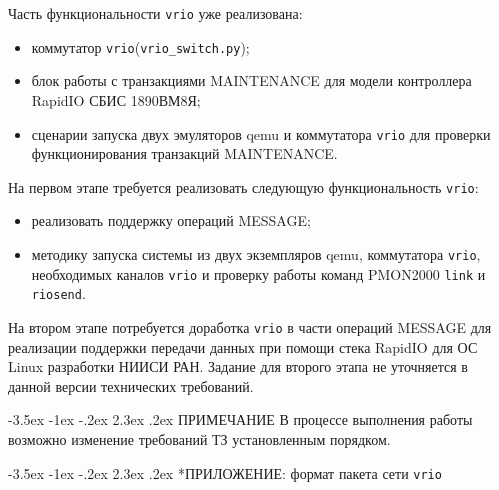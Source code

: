 \documentclass[14pt,a4paper,oneside]{report}
\makeatletter
\renewcommand\section{\@startsection {section}{1}{\z@}%
                                   {-3.5ex \@plus -1ex \@minus -.2ex}%
                                   {2.3ex \@plus.2ex}%
                                   {\normalfont\normalsize}}
\newcommand{\vrio}{\texttt{vrio}\xspace}
\makeatother
\begin{document}
Часть функциональности \vrio уже реализована:
\begin{itemize}
\item коммутатор \vrio (\verb#vrio_switch.py#);
\item блок работы с транзакциями MAINTENANCE для модели
контроллера RapidIO СБИС 1890ВМ8Я;
\item сценарии запуска двух эмуляторов qemu и коммутатора \vrio для
проверки функционирования транзакций MAINTENANCE.
\end{itemize}

На первом этапе требуется реализовать следующую функциональность \vrio:
\begin{itemize}
\item реализовать поддержку операций MESSAGE;
\item методику запуска системы из двух экземпляров qemu, коммутатора \vrio,
необходимых каналов \vrio и проверку работы команд PMON2000 \texttt{link}
и \texttt{riosend}.
\end{itemize}

На втором этапе потребуется доработка \vrio в части операций MESSAGE
для реализации поддержки передачи данных при помощи стека RapidIO для ОС Linux
разработки НИИСИ РАН. Задание для второго этапа не уточняется в данной версии
технических требований.


\section{ПРИМЕЧАНИЕ}
В процессе выполнения работы возможно изменение требований ТЗ установленным порядком.

\eject

\section*{ПРИЛОЖЕНИЕ: формат пакета сети \vrio}
\end{document}
